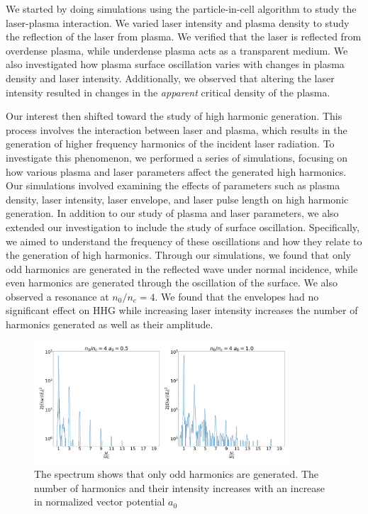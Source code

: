 \documentclass[12pt]{article}
\begin{document}
We started by doing simulations using the particle-in-cell algorithm to study the laser-plasma interaction. We varied laser intensity and plasma density to study the reflection of the laser from plasma. We verified that the laser is reflected from overdense plasma, while underdense plasma acts as a transparent medium. We also investigated how plasma surface oscillation varies with changes in plasma density and laser intensity. Additionally, we observed that altering the laser intensity resulted in changes in the \textit{apparent} critical density of the plasma.

Our interest then shifted toward the study of high harmonic generation. This process involves the interaction between laser and plasma, which results in the generation of higher frequency harmonics of the incident laser radiation. To investigate this phenomenon, we performed a series of simulations, focusing on how various plasma and laser parameters affect the generated high harmonics. Our simulations involved examining the effects of parameters such as plasma density, laser intensity, laser envelope, and laser pulse length on high harmonic generation. In addition to our study of plasma and laser parameters, we also extended our investigation to include the study of surface oscillation. Specifically, we aimed to understand the frequency of these oscillations and how they relate to the generation of high harmonics. Through our simulations, we found that only odd harmonics are generated in the reflected wave under normal incidence, while even harmonics are generated through the oscillation of the surface. We also observed a resonance at $n_0/n_c = 4$. We found that the envelopes had no significant effect on HHG while increasing laser intensity increases the number of harmonics generated as well as their amplitude.

\begin{figure}[h]
    \centering
    \includegraphics[width=0.85\textwidth]{images/intensity.jpg}
    \caption{The spectrum shows that only odd harmonics are generated. The number of harmonics and their intensity increases with an increase in normalized vector potential $a_0$}
    \label{fig:intensity}
\end{figure}
\end{document}
